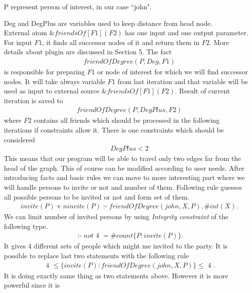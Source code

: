 \documentclass[14pt,a4paper, titlepage]{article}
\newcommand{\ext}[3]{\ensuremath{\&{#1}[#2](#3)}}
\DeclareMathOperator{\leftimpl}{:-}
\begin{document}
P represent person of interest, in our case ``john".  


Deg and DegPlus are variables used to keep distance from head node.
\\External atom \ext{friendsOf}{F1}{F2} has one input and one output parameter. For input $\mathit{F1}$, 
it finds all successor nodes of it and return them in $\mathit{F2}$. More details about plugin are discussed
 in Section 5. 
The fact
\begin{align*}
& \mathit{friendOfDegree(P, Deg, F1)}
\end{align*}
is responsible for preparing $\mathit{F1}$ or node of interest for which we will find successor nodes. 
It will take always variable $\mathit{F1}$ from last iteration and that variable will be used as input to 
external source \ext{friendsOf}{F1}{F2}.
Result of current iteration is saved to 
\begin{align*}
& \mathit{friendOfDegree(P, DegPlus, F2)}
\end{align*} 
where $\mathit{F2}$ contains all friends which should be processed in the following iterations if constraints allow it. 
There is one constraints which should be considered
\begin{align*}
& \mathit{DegPlus < 2}
\end{align*}
This means that our program will be able to travel only two edges far from the head of the graph. This of course can be modified according to user needs. After introducing facts and basic rules we can move to more interesting part where we will handle persons to invite or not and number of them. Following rule guesses all possible persons to be invited or not and form set of them.
\begin{align*}
& \mathit{invite(P)} \text{ v } \mathit{ninvite(P) \leftimpl friendOfDegree(john,X,P), \#int(X).}
\end{align*}     
We can limit number of invited persons by using \emph{Integrity constraint} of the following type.
\begin{align*}
& \leftimpl \mathit{not} \text{ 4 } = \mathit{\#count} \{ P : \mathit{invite(P)} \}.
\end{align*} 
It gives 4 different sets of people which might me invited to the party. It is possible to replace 
last two statements with the following rule
\begin{align*}
& \text{ 4 } \leq \{ invite(P) : friendOfDegree(john,X,P) \} \leq \text{ 4 }. 
\end{align*}
It is doing exactly same thing as two statements above. However it is more powerful since it is 
\end{document}

